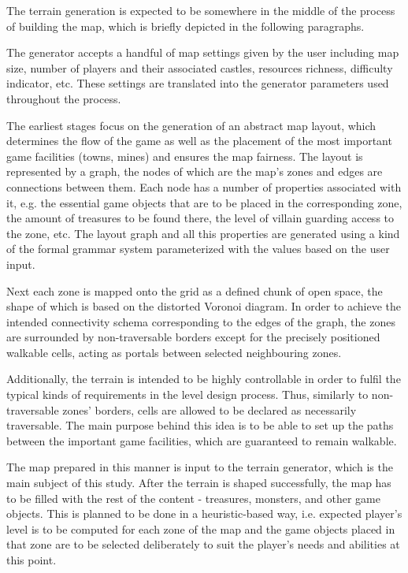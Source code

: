 \documentclass[a4paper, 11pt]{article} %
\begin{document}
The terrain generation is expected to be somewhere in the middle of the process of building the map, which is briefly depicted in the following paragraphs.

The generator accepts a handful of map settings given by the user including map size, number of players and their associated castles, resources richness, difficulty indicator, etc. These settings are translated into the generator parameters used throughout the process.

The earliest stages focus on the generation of an abstract map layout, which determines the flow of the game as well as the placement of the most important game facilities (towns, mines) and ensures the map fairness. The layout is represented by a graph, the nodes of which are the map's zones and edges are connections between them. Each node has a number of properties associated with it, e.g. the essential game objects that are to be placed in the corresponding zone, the amount of treasures to be found there, the level of villain guarding access to the zone, etc. The layout graph and all this properties are generated using a kind of the formal grammar system parameterized with the values based on the user input. 

Next each zone is mapped onto the grid as a defined chunk of open space, the shape of which is based on the distorted Voronoi diagram. In order to achieve the intended connectivity schema corresponding to the edges of the graph, the zones are surrounded by non-traversable borders except for the precisely positioned walkable cells, acting as portals between selected neighbouring zones. 

Additionally, the terrain is intended to be highly controllable in order to fulfil the typical kinds of requirements in the level design process. Thus, similarly to non-traversable zones' borders, cells are allowed to be declared as necessarily traversable. The main purpose behind this idea is to be able to set up the paths between the important game facilities, which are guaranteed to remain walkable.

The map prepared in this manner is input to the terrain generator, which is the main subject of this study. After the terrain is shaped successfully, the map has to be filled with the rest of the content - treasures, monsters, and other game objects. This is planned to be done in a heuristic-based way, i.e. expected player's level is to be computed for each zone of the map and the game objects placed in that zone are to be selected deliberately to suit the player's needs and abilities at this point.
\end{document}
